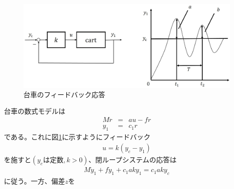 \documentclass[a4j,11pt,twoside]{ujbook}
\begin{document}
\begin{figure}[htbp]
	\begin{center}
		\includegraphics[width = 1.0 \linewidth]{feedback.eps}
		\caption{台車のフィードバック応答}
		\label{fig:台車のフィードバック応答}
	\end{center}
\end{figure}

台車の数式モデルは
\begin{eqnarray}
	M\ddot{r} & = & au - fr \\
	y_1 & = & c_1r
\end{eqnarray}
である。これに図\ref{fig:台車のフィードバック応答}に示すようにフィードバック
\begin{eqnarray}
	u = k(y_c - y_1)
\end{eqnarray}
を施すと$(y_cは定数,k>0)$、閉ループシステムの応答は
\begin{eqnarray}
	M\ddot{y}_1 + f\dot{y}_1 + c_1aky_1 = c_1aky_c
\end{eqnarray}
に従う。一方、偏差$z$を
\end{document}
